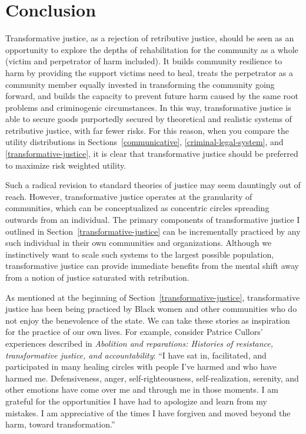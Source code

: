 \documentclass{article}
\begin{document}
    \section{Conclusion}


        Transformative justice, as a rejection of retributive justice, should be seen as an opportunity to explore the depths of rehabilitation for the community as a whole (victim and perpetrator of harm included). It builds community resilience to harm by providing the support victims need to heal, treats the perpetrator as a community member equally invested in transforming the community going forward, and builds the capacity to prevent future harm caused by the same root problems and criminogenic circumstances. In this way, transformative justice is able to secure goods purportedly secured by theoretical and realistic systems of retributive justice, with far fewer risks. For this reason, when you compare the utility distributions in Sections~\ref{communicative}, \ref{criminal-legal-system}, and \ref{transformative-justice}, it is clear that transformative justice should be preferred to maximize risk weighted utility. 


        Such a radical revision to standard theories of justice may seem dauntingly out of reach. However, transformative justice operates at the granularity of communities, which can be conceptualized as concentric circles spreading outwards from an individual. The primary components of transformative justice I outlined in Section~\ref{transformative-justice} can be incrementally practiced by any such individual in their own communities and organizations. Although we instinctively want to scale such systems to the largest possible population, transformative justice can provide immediate benefits from the mental shift away from a notion of justice saturated with retribution. 

        As mentioned at the beginning of Section~\ref{transformative-justice}, transformative justice has been being practiced by Black women and other communities who do not enjoy the benevolence of the state. We can take these stories as inspiration for the practice of our own lives. For example, consider Patrice Cullors' experiences described in \textit{Abolition and reparations: Histories of resistance, transformative justice, and accountability}: ``I have sat in, facilitated, and participated in many healing circles with people I’ve harmed and who have harmed me. Defensiveness, anger, self-righteousness, self-realization, serenity, and other emotions have come over me and through me in those moments. I am grateful for the opportunities I have had to apologize and learn from my mistakes. I am appreciative of the times I have forgiven and moved beyond the harm, toward transformation.''\cite{histories-of-tj}
\end{document}
